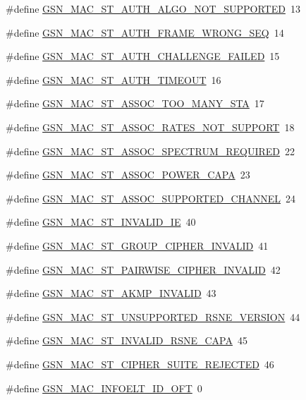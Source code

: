 \begin{DoxyCompactItemize}
\#define \hyperlink{a00523_accd41f465ade7f983dc1cb817e09ef25}{GSN\_\-MAC\_\-ST\_\-AUTH\_\-ALGO\_\-NOT\_\-SUPPORTED}~13
\item 
\#define \hyperlink{a00523_a9a09aaac9fdcc63e3bebc7c874242373}{GSN\_\-MAC\_\-ST\_\-AUTH\_\-FRAME\_\-WRONG\_\-SEQ}~14
\item 
\#define \hyperlink{a00523_a64bc18f039ce63e7ca441bccf124741f}{GSN\_\-MAC\_\-ST\_\-AUTH\_\-CHALLENGE\_\-FAILED}~15
\item 
\#define \hyperlink{a00523_addb17130bf92ab6b55e8641c725a7243}{GSN\_\-MAC\_\-ST\_\-AUTH\_\-TIMEOUT}~16
\item 
\#define \hyperlink{a00523_a9c4e71f0971f4b7225360a5de41bd6ce}{GSN\_\-MAC\_\-ST\_\-ASSOC\_\-TOO\_\-MANY\_\-STA}~17
\item 
\#define \hyperlink{a00523_a2ed0778485c0b949be91bebe7aa8dca1}{GSN\_\-MAC\_\-ST\_\-ASSOC\_\-RATES\_\-NOT\_\-SUPPORT}~18
\item 
\#define \hyperlink{a00523_a61ad1c97d393eda7e58775e081d76b87}{GSN\_\-MAC\_\-ST\_\-ASSOC\_\-SPECTRUM\_\-REQUIRED}~22
\item 
\#define \hyperlink{a00523_a5b015b54f4401ea85c0d9d3913250d07}{GSN\_\-MAC\_\-ST\_\-ASSOC\_\-POWER\_\-CAPA}~23
\item 
\#define \hyperlink{a00523_a21609ae928f4b808f176f8f3a2971ffe}{GSN\_\-MAC\_\-ST\_\-ASSOC\_\-SUPPORTED\_\-CHANNEL}~24
\item 
\#define \hyperlink{a00523_a280c715605d449f200185763d41a8f95}{GSN\_\-MAC\_\-ST\_\-INVALID\_\-IE}~40
\item 
\#define \hyperlink{a00523_a6ae124f5defcbf949ca23c560a55f964}{GSN\_\-MAC\_\-ST\_\-GROUP\_\-CIPHER\_\-INVALID}~41
\item 
\#define \hyperlink{a00523_a4532c1f13c11bfad4900549e8cfad8a2}{GSN\_\-MAC\_\-ST\_\-PAIRWISE\_\-CIPHER\_\-INVALID}~42
\item 
\#define \hyperlink{a00523_a916a1c88dab1d3ff4e11d5285af162fb}{GSN\_\-MAC\_\-ST\_\-AKMP\_\-INVALID}~43
\item 
\#define \hyperlink{a00523_a635097e807319e2cdc4e8f8c5c0eb9b0}{GSN\_\-MAC\_\-ST\_\-UNSUPPORTED\_\-RSNE\_\-VERSION}~44
\item 
\#define \hyperlink{a00523_aa8bb6b9dd6f74a8c754c04495e2705ec}{GSN\_\-MAC\_\-ST\_\-INVALID\_\-RSNE\_\-CAPA}~45
\item 
\#define \hyperlink{a00523_a57a4b425da26c423dd9683196caa5764}{GSN\_\-MAC\_\-ST\_\-CIPHER\_\-SUITE\_\-REJECTED}~46
\item 
\#define \hyperlink{a00523_a2c02bb5d28c562f4067841e620979032}{GSN\_\-MAC\_\-INFOELT\_\-ID\_\-OFT}~0

\end{DoxyCompactItemize}
